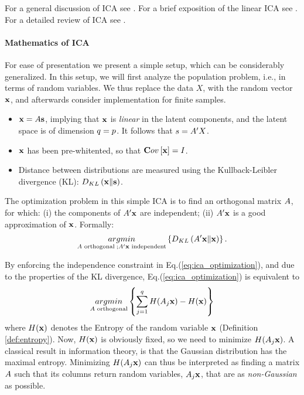 For a general discussion of ICA see \cite{jolliffe_principal_2002}.
For a brief exposition of the linear ICA see \cite{hastie_elements_2003}. 
For a detailed review of ICA see \cite{hyvarinen_independent_2000}. 



\paragraph{Mathematics of ICA}
For ease of presentation we present a simple setup, which can be considerably generalized. 
In this setup, we will first analyze the population problem, i.e., in terms of random variables. 
We thus replace the data $X$, with the random vector $\mathbf{x}$, and afterwards consider implementation for finite samples. 
\begin{itemize}
\item $\mathbf{x}=A \mathbf{s}$, implying that $\mathbf{x}$ is \emph{linear} in the latent components, and the latent space is of dimension $q=p$. It follows that $s=A'X$.
\item $\mathbf{x}$ has been pre-whitented, so that $\mathbf{C}ov \left[ \mathbf{x} \right]=I$.
\item Distance between distributions are measured using the Kullback-Leibler divergence (KL): $D_{KL}\left(\mathbf{x} \Vert \mathbf{s} \right)$.
\end{itemize}

The optimization problem in this simple ICA is to find an orthogonal matrix $A$, for which:
(i) the components of $A'\mathbf{x}$ are independent;
(ii) $A'\mathbf{x}$ is a good approximation of $\mathbf{x}$.
Formally: 
\begin{align}
\label{eq:ica_optimization}
	\mathop{argmin} _{A \text{ orthogonal} \;; A'\mathbf{x} \text{ independent}}\left\{ D_{KL}\left(A'\mathbf{x} \Vert \mathbf{x} \right) \right\}.
\end{align}


By enforcing the independence constraint in Eq.(\ref{eq:ica_optimization}), and due to the properties of the KL divergence, Eq.(\ref{eq:ica_optimization}) is equivalent to
\begin{align}
\label{eq:ica_optimization2}
	\mathop{argmin} _{A \text{ orthogonal}}\left\{ \sum_{j=1}^{q} H(A_j\mathbf{x})- H(\mathbf{x}) \right\}
\end{align}
where $H(\mathbf{x})$ denotes the Entropy of the random variable $\mathbf{x}$ (Definition \ref{def:entropy}).
Now, $H(\mathbf{x})$ is obviously fixed, so we need to minimize $H(A_j\mathbf{x})$. 
A classical result in information theory, is that the Gaussian distribution has the maximal entropy. 
Minimizing $H(A_j\mathbf{x})$ can thus be interpreted as finding a matrix $A$ such that its columns return random variables, $A_j\mathbf{x}$, that are as \emph{non-Gaussian} as possible.

